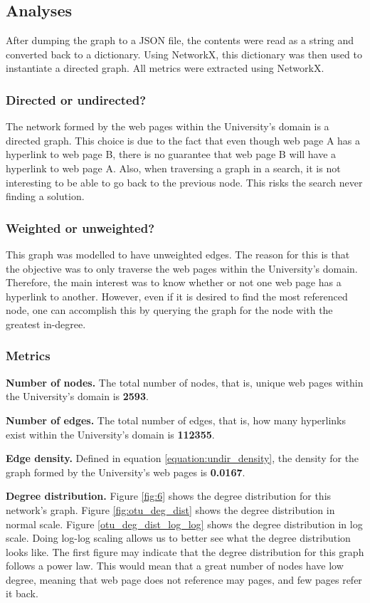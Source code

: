 \subsection{Analyses}
After dumping the graph to a JSON file, the contents were read as a string and converted back to a dictionary. Using NetworkX, this dictionary was then used to instantiate a directed graph. All metrics were extracted using NetworkX.

\subsubsection{Directed or undirected?} The network formed by the web pages within the University's domain is a directed graph. This choice is due to the fact that even though web page A has a hyperlink to web page B, there is no guarantee that web page B will have a hyperlink to web page A. Also, when traversing a graph in a search, it is not interesting to be able to go back to the previous node. This risks the search never finding a solution.

\subsubsection{Weighted or unweighted?} This graph was modelled to have unweighted edges. The reason for this is that the objective was to only traverse the web pages within the University's domain. Therefore, the main interest was to know whether or not one web page has a hyperlink to another. However, even if it is desired to find the most referenced node, one can accomplish this by querying the graph for the node with the greatest in-degree.

\subsubsection{Metrics}
\textbf{Number of nodes.} The total number of nodes, that is, unique web pages within the University's domain is \textbf{2593}.

\textbf{Number of edges.} The total number of edges, that is, how many hyperlinks exist within the University's domain is \textbf{112355}.

\textbf{Edge density.} Defined in equation \ref{equation:undir_density}, the density for the graph formed by the University's web pages is \textbf{0.0167}.

\textbf{Degree distribution.} Figure \ref{fig:6} shows the degree distribution for this network's graph. Figure \ref{fig:otu_deg_dist} shows the degree distribution in normal scale. Figure \ref{otu_deg_dist_log_log} shows the degree distribution in log scale. Doing log-log scaling allows us to better see what the degree distribution looks like. The first figure may indicate that the degree distribution for this graph follows a power law. This would mean that a great number of nodes have low degree, meaning that web page does not reference may pages, and few pages refer it back.

